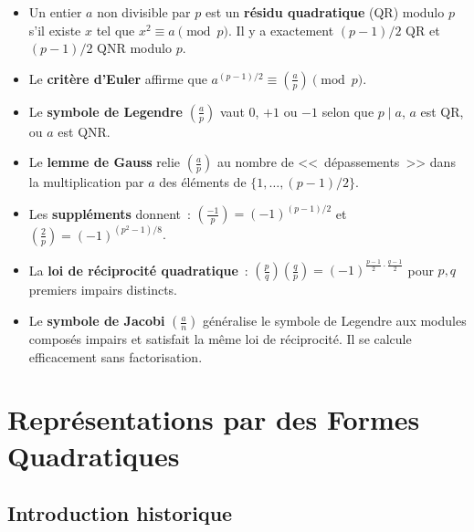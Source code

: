 \documentclass[12pt,a4paper,openany]{book}
\theoremstyle{definition}
\theoremstyle{plain}
\theoremstyle{remark}
\newcommand{\legendre}[2]{\left(\frac{#1}{#2}\right)}
\newcommand{\jacobi}[2]{\left(\frac{#1}{#2}\right)}
\begin{document}
\begin{itemize}
  \item Un entier $a$ non divisible par $p$ est un \textbf{résidu quadratique}
        (QR) modulo $p$ s'il existe $x$ tel que $x^2 \equiv a \pmod{p}$.
        Il y a exactement $(p-1)/2$ QR et $(p-1)/2$ QNR modulo $p$.

  \item Le \textbf{critère d'Euler} affirme que
        $a^{(p-1)/2} \equiv \legendre{a}{p} \pmod{p}$.

  \item Le \textbf{symbole de Legendre} $\legendre{a}{p}$ vaut $0$, $+1$ ou $-1$
        selon que $p \mid a$, $a$ est QR, ou $a$ est QNR.

  \item Le \textbf{lemme de Gauss} relie $\legendre{a}{p}$ au nombre de
        <<~dépassements~>> dans la multiplication par $a$ des éléments de
        $\{1, \ldots, (p-1)/2\}$.

  \item Les \textbf{suppléments} donnent~:
        $\legendre{-1}{p} = (-1)^{(p-1)/2}$ et
        $\legendre{2}{p} = (-1)^{(p^2-1)/8}$.

  \item La \textbf{loi de réciprocité quadratique}~:
        $\legendre{p}{q} \legendre{q}{p} = (-1)^{\frac{p-1}{2}\cdot\frac{q-1}{2}}$
        pour $p, q$ premiers impairs distincts.

  \item Le \textbf{symbole de Jacobi} $\jacobi{a}{n}$ généralise le symbole de
        Legendre aux modules composés impairs et satisfait la même loi de
        réciprocité. Il se calcule efficacement sans factorisation.
\end{itemize}


\chapter{Représentations par des Formes Quadratiques}
\label{chap:formes-quadratiques}

\section*{Introduction historique}
\end{document}

